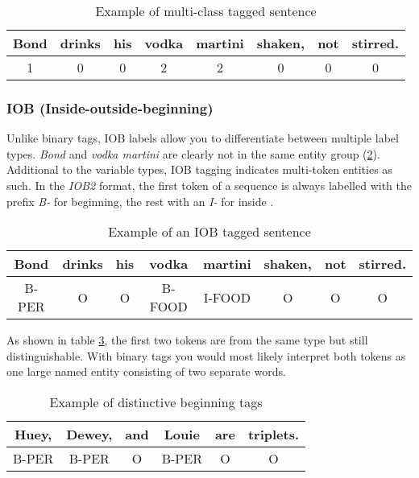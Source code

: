 \begin{table}[h!]
    \centering
    \begin{tabular}{|c|c|c|c|c|c|c|c|}
        \hline
        Bond & drinks & his & vodka & martini & shaken, & not & stirred. \\
        \hline
        1 & 0 & 0 & 2 & 2 & 0 & 0 & 0 \\
        \hline
    \end{tabular}
    \caption{Example of multi-class tagged sentence}
    \label{tbl:multiclass-labelling}
\end{table}

\subsubsection{IOB (Inside-outside-beginning)}

Unlike binary tags, IOB labels allow you to differentiate between multiple label types. \emph{Bond} and \emph{vodka martini} are clearly not in the same entity group (\ref{tbl:iob-labelling}). Additional to the variable types, IOB tagging indicates multi-token entities as such. In the \emph{IOB2} format, the first token of a sequence is always labelled with the prefix \emph{B-} for beginning, the rest with an \emph{I-} for inside \cite{bio95}.

\begin{table}[h!]
    \centering
    \begin{tabular}{|c|c|c|c|c|c|c|c|}
        \hline
        Bond & drinks & his & vodka & martini & shaken, & not & stirred. \\
        \hline
        B-PER & O & O & B-FOOD & I-FOOD & O & O & O \\
        \hline
    \end{tabular}
    \caption{Example of an IOB tagged sentence}
    \label{tbl:iob-labelling}
\end{table}

As shown in table \ref{tbl:iob-labelling2}, the first two tokens are from the same type but still distinguishable. With binary tags you would most likely interpret both tokens as one large named entity consisting of two separate words.

\begin{table}[ht!]
    \centering
    \begin{tabular}{|c|c|c|c|c|c|}
        \hline
        Huey, & Dewey, & and & Louie & are & triplets. \\
        \hline
        B-PER & B-PER & O & B-PER & O & O \\
        \hline
    \end{tabular}
    \caption{Example of distinctive beginning tags}
    \label{tbl:iob-labelling2}
\end{table}

